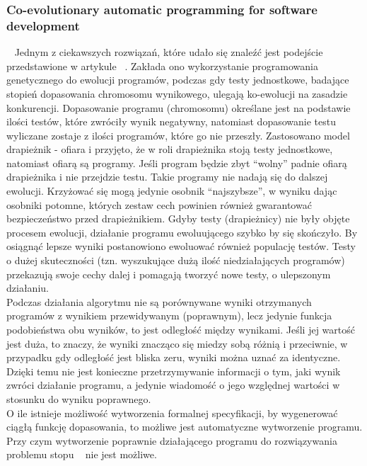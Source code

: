\documentclass[twoside,a4paper,10]{book}
\begin{document}
\subsubsection{Co-evolutionary automatic programming for software development} ~\label{sec:coEvo}
Jednym z ciekawszych rozwiązań, które udało się znaleźć jest podejście przedstawione w artykule ~\cite{coEvolution}. Zakłada ono wykorzystanie programowania genetycznego do ewolucji programów, podczas gdy testy jednostkowe, badające stopień dopasowania chromosomu wynikowego, ulegają  ko-ewolucji na zasadzie konkurencji. Dopasowanie programu (chromosomu) określane jest na podstawie ilości testów, które zwróciły wynik negatywny, natomiast dopasowanie testu wyliczane zostaje z ilości programów, które go nie przeszły. 
Zastosowano model drapieżnik - ofiara i przyjęto, że w roli drapieżnika stoją testy jednostkowe, natomiast ofiarą są programy. Jeśli program będzie zbyt \enquote{wolny} padnie ofiarą drapieżnika i nie przejdzie testu. Takie programy nie nadają się do dalszej ewolucji. Krzyżować się mogą jedynie osobnik \enquote{najszybsze}, w wyniku dając osobniki potomne, których zestaw cech powinien również gwarantować bezpieczeństwo przed drapieżnikiem. Gdyby testy (drapieżnicy) nie były objęte procesem ewolucji,  działanie programu ewoluującego szybko by się skończyło. By osiągnąć lepsze wyniki postanowiono ewoluować również populację testów. Testy o dużej skuteczności (tzn. wyszukujące dużą ilość niedziałających programów) przekazują swoje cechy dalej i pomagają tworzyć nowe testy, o ulepszonym działaniu. 
\\ Podczas działania algorytmu nie są porównywane wyniki otrzymanych programów z wynikiem przewidywanym (poprawnym), lecz jedynie  funkcja podobieństwa obu wyników, to jest odległość między wynikami. Jeśli jej wartość jest duża, to znaczy, że wyniki znacząco się miedzy sobą różnią i przeciwnie, w przypadku gdy odległość jest bliska zeru, wyniki można uznać za identyczne.  Dzięki temu nie jest konieczne przetrzymywanie informacji o tym, jaki wynik zwróci działanie programu, a jedynie wiadomość o jego względnej wartości w stosunku do wyniku poprawnego. 
\\  O ile istnieje możliwość wytworzenia formalnej specyfikacji, by wygenerować ciągłą funkcję dopasowania, to możliwe jest automatyczne wytworzenie programu. Przy czym wytworzenie poprawnie działającego programu  do rozwiązywania problemu stopu  ~\cite{algHalt} nie jest możliwe. 
\end{document}

